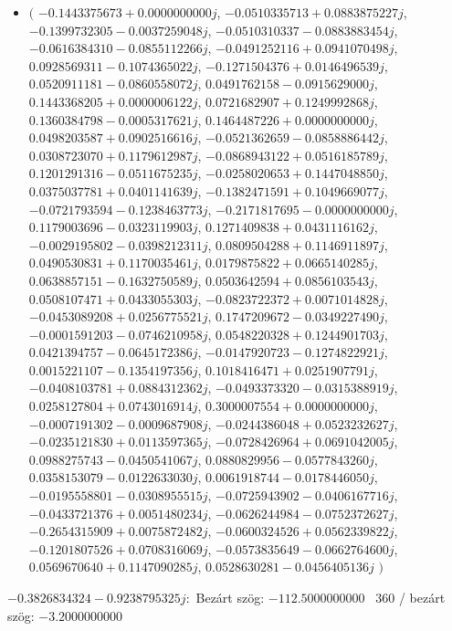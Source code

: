 \documentclass[14pt,a4paper]{article}
\begin{document}
\begin{itemize}
\item
$\big($
$-0.1443375673+0.0000000000j$, $-0.0510335713+0.0883875227j$, $-0.1399732305-0.0037259048j$, $-0.0510310337-0.0883883454j$, $-0.0616384310-0.0855112266j$, $-0.0491252116+0.0941070498j$, $0.0928569311-0.1074365022j$, $-0.1271504376+0.0146496539j$, $0.0520911181-0.0860558072j$, $0.0491762158-0.0915629000j$, $0.1443368205+0.0000006122j$, $0.0721682907+0.1249992868j$, $0.1360384798-0.0005317621j$, $0.1464487226+0.0000000000j$, $0.0498203587+0.0902516616j$, $-0.0521362659-0.0858886442j$, $0.0308723070+0.1179612987j$, $-0.0868943122+0.0516185789j$, $0.1201291316-0.0511675235j$, $-0.0258020653+0.1447048850j$, $0.0375037781+0.0401141639j$, $-0.1382471591+0.1049669077j$, $-0.0721793594-0.1238463773j$, $-0.2171817695-0.0000000000j$, $0.1179003696-0.0323119903j$, $0.1271409838+0.0431116162j$, $-0.0029195802-0.0398212311j$, $0.0809504288+0.1146911897j$, $0.0490530831+0.1170035461j$, $0.0179875822+0.0665140285j$, $0.0638857151-0.1632750589j$, $0.0503642594+0.0856103543j$, $0.0508107471+0.0433055303j$, $-0.0823722372+0.0071014828j$, $-0.0453089208+0.0256775521j$, $0.1747209672-0.0349227490j$, $-0.0001591203-0.0746210958j$, $0.0548220328+0.1244901703j$, $0.0421394757-0.0645172386j$, $-0.0147920723-0.1274822921j$, $0.0015221107-0.1354197356j$, $0.1018416471+0.0251907791j$, $-0.0408103781+0.0884312362j$, $-0.0493373320-0.0315388919j$, $0.0258127804+0.0743016914j$, $0.3000007554+0.0000000000j$, $-0.0007191302-0.0009687908j$, $-0.0244386048+0.0523232627j$, $-0.0235121830+0.0113597365j$, $-0.0728426964+0.0691042005j$, $0.0988275743-0.0450541067j$, $0.0880829956-0.0577843260j$, $0.0358153079-0.0122633030j$, $0.0061918744-0.0178446050j$, $-0.0195558801-0.0308955515j$, $-0.0725943902-0.0406167716j$, $-0.0433721376+0.0051480234j$, $-0.0626244984-0.0752372627j$, $-0.2654315909+0.0075872482j$, $-0.0600324526+0.0562339822j$, $-0.1201807526+0.0708316069j$, $-0.0573835649-0.0662764600j$, $0.0569670640+0.1147090285j$, $0.0528630281-0.0456405136j$
$\big)$
\end{itemize}
$-0.3826834324-0.9238795325j$:\
Bezárt szög: $-112.5000000000$ \
360 / bezárt szög: $-3.2000000000$\
\end{document}
